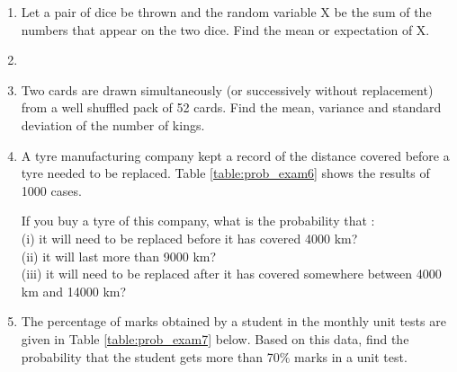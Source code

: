 \begin{enumerate}[label=\thesection.\arabic*.,ref=\thesection.\theenumi]
\item Let a pair of dice be thrown and the random variable X be the sum of the numbers that appear on the two dice. Find the mean or expectation of X.\\
\solution


\item

\item Two cards are drawn simultaneously (or successively without replacement) from a well shuffled pack of 52 cards. Find the mean, variance and standard deviation of the number of kings.\\
\solution

\item A tyre manufacturing company kept a record of the distance covered
before a tyre needed to be replaced. Table \ref{table:prob_exam6}
shows the results of 1000 cases.
\begin{table}[!ht]
\centering
{}
\caption{}
\label{table:prob_exam6}
\end{table}
If you buy a tyre of this company, what is the probability that :\\
(i) it will need to be replaced before it has covered 4000 km?\\
(ii) it will last more than 9000 km?\\
(iii) it will need to be replaced after it has covered somewhere between 4000 km and 14000 km?\\
\solution


\item The percentage of marks obtained by a student in the monthly unit tests are given in Table \ref{table:prob_exam7}
below.
Based on this data, find the probability that the student gets more than 70$\%$ marks in a unit test.\\


\end{enumerate}
